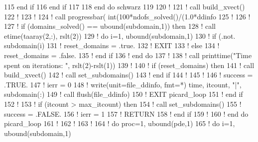 \begin{DoxyCode}
115 \textcolor{keywordflow}{            end if}
116 \textcolor{keywordflow}{          end if}
117         
118 \textcolor{keywordflow}{        end do} schwarz
119           
120 \textcolor{comment}{!           }
121 \textcolor{comment}{!         call build\_xvect()}
122 \textcolor{comment}{!   }
123 \textcolor{comment}{!           }
124 \textcolor{comment}{!         call progressbar( int(100*ndofs\_solved()/(1.0*ddinfo%
125 \textcolor{comment}{!         }
126 \textcolor{comment}{! }
127 \textcolor{comment}{!         if (domains\_solved() == ubound(subdomain,1)) then}
128 \textcolor{comment}{!           call etime(taaray(2,:), rslt(2))}
129 \textcolor{comment}{!           do i=1, ubound(subdomain,1)}
130 \textcolor{comment}{!             if (.not. subdomain(i)%
131 \textcolor{comment}{!               reset\_domains = .true.}
132 \textcolor{comment}{!               EXIT}
133 \textcolor{comment}{!             else}
134 \textcolor{comment}{!               reset\_domains = .false.}
135 \textcolor{comment}{!             end if}
136 \textcolor{comment}{!           end do}
137 \textcolor{comment}{!          }
138 \textcolor{comment}{!           call printtime("Time spent on iterations: ", rslt(2)-rslt(1))}
139 \textcolor{comment}{!           }
140 \textcolor{comment}{!           if (reset\_domains) then}
141 \textcolor{comment}{!             call build\_xvect()}
142 \textcolor{comment}{!             call set\_subdomains()}
143 \textcolor{comment}{!           end if}
144 \textcolor{comment}{!           }
145 \textcolor{comment}{!           }
146 \textcolor{comment}{!           success = .TRUE.}
147 \textcolor{comment}{!           ierr = 0}
148 \textcolor{comment}{!           write(unit=file\_ddinfo, fmt=*) time, itcount, "|", subdomain(:)%
149 \textcolor{comment}{!           call flush(file\_ddinfo)}
150 \textcolor{comment}{!           EXIT picard\_loop}
151 \textcolor{comment}{!         end if}
152 \textcolor{comment}{! }
153 \textcolor{comment}{!         if (itcount > max\_itcount) then}
154 \textcolor{comment}{!           call set\_subdomains()}
155 \textcolor{comment}{!           success = .FALSE.}
156 \textcolor{comment}{!           ierr = 1}
157 \textcolor{comment}{!           RETURN}
158 \textcolor{comment}{!         end if}
159 \textcolor{comment}{! }
160 \textcolor{comment}{!         end do picard\_loop}
161 \textcolor{comment}{! }
162 \textcolor{comment}{! }
163 \textcolor{comment}{! }
164 \textcolor{comment}{!         do proc=1, ubound(pde,1)}
165 \textcolor{comment}{!         do i=1, ubound(subdomain,1)}
}}}
\end{DoxyCode}

